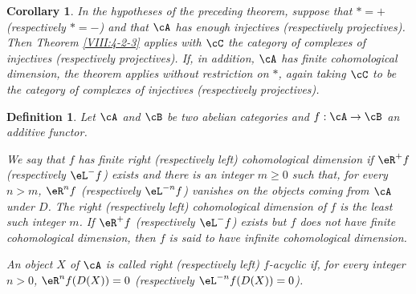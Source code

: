 \documentclass[12pt,oneside,english]{smfbook}
\newtheorem{corollary}[subsubsection]{Corollary}
\newtheorem{definition}[subsubsection]{Definition}
\begin{document}
\begin{corollary}\label{VIII:4-2-3-1} %
In the hypotheses of the preceding theorem, suppose that $\ast=+$ (respectively $\ast=-$) and that $\cA$ has enough injectives (respectively projectives). Then Theorem \ref{VIII:4-2-3} applies with $\cC$ the category of complexes of injectives (respectively projectives). If, in addition, $\cA$ has finite cohomological dimension, the theorem applies without restriction on $\ast$, again taking $\cC$ to be the category of complexes of injectives (respectively projectives).
\end{corollary}

\begin{definition}\label{VIII:4-2-5} %
Let $\cA$ and $\cB$ be two abelian categories and $f:\cA\to\cB$ an additive functor.

We say that $f$ has finite right (respectively left) \emph{cohomological dimension} if $\eR^+f$ (respectively $\eL^-f$) exists and there is an integer $m\geqslant0$ such that, for every $n>m$, $\eR^nf$ (respectively $\eL^{-n}f$) vanishes on the objects coming from $\cA$ under $D$. The right (respectively left) \emph{cohomological dimension} of $f$ is the least such integer $m$. If $\eR^+f$ (respectively $\eL^-f$) exists but $f$ does not have finite cohomological dimension, then $f$ is said to have infinite cohomological dimension.

An object $X$ of $\cA$ is called right (respectively left) \emph{$f$-acyclic} if, for every integer $n>0$, $\eR^nf(D(X))=0$ (respectively $\eL^{-n}f(D(X))=0$).
\end{definition}
\end{document}
